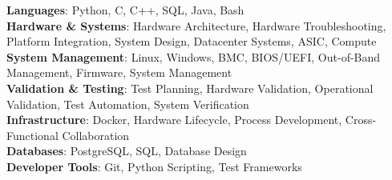 \begin{itemize}[leftmargin=0.15in, label={}]
  \normalsize{\item{

    \textbf{Languages}{: Python, C, C++, SQL, Java, Bash} \\
    \textbf{Hardware \& Systems}{: Hardware Architecture, Hardware Troubleshooting, Platform Integration, System Design, Datacenter Systems, ASIC, Compute} \\
    \textbf{System Management}{: Linux, Windows, BMC, BIOS/UEFI, Out-of-Band Management, Firmware, System Management} \\
    \textbf{Validation \& Testing}{: Test Planning, Hardware Validation, Operational Validation, Test Automation, System Verification} \\
    \textbf{Infrastructure}{: Docker, Hardware Lifecycle, Process Development, Cross-Functional Collaboration} \\
    \textbf{Databases}{: PostgreSQL, SQL, Database Design} \\
    \textbf{Developer Tools}{: Git, Python Scripting, Test Frameworks} \\

  }}
\end{itemize}
